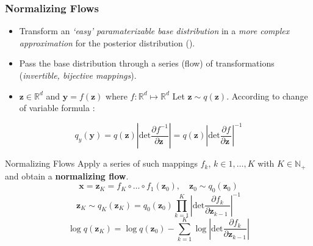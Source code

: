 \documentclass{beamer}
\begin{document}
\begin{frame}

\frametitle{Normalizing Flows}
\begin{itemize}
    \item Transform an \textit{‘easy' paramaterizable base distribution} in a \textit{more complex approximation} for the posterior distribution (\cite{rezende2015variational}).
    \pause
    \item Pass the base distribution through a series (flow) of transformations (\textit{invertible, bijective mappings}).
    \pause
    \item $\mathbf{z} \in \mathbb{R}^d$ and $\mathbf{y} = f(\mathbf{z})$ where $f: \mathbb{R}^d \mapsto \mathbb{R}^d$  Let $\mathbf{z} \sim q(\mathbf{z})$. According to change of variable formula :
\end{itemize}
\pause
\begin{equation}
    q_y(\mathbf{y}) = q(\mathbf{z}) \left|
    \mathrm{det} \frac{
      \partial f^{-1}
    }{
      \partial \mathbf{z}\
    }
  \right|
  = q(\mathbf{z}) \left|
    \mathrm{det} \frac{
      \partial f
    }{
      \partial \mathbf{z}\
    }
  \right| ^{-1}
\end{equation}
\end{frame}

\begin{frame}{Normalizing Flows}
Apply a series of such mappings $f_k$, $k \in {1,\dots, K}$ with $K \in \mathbb{N}_+$ and obtain a \textbf{normalizing flow}.
\pause
\begin{equation}
    \mathbf{x} = \mathbf{z}_K = f_K \circ \dots \circ f_1 (\mathbf{z}_0), \quad \mathbf{z}_0 \sim q_0(\mathbf{z}_0)
\end{equation}
\pause
\begin{equation}
    \mathbf{z}_K \sim q_K(\mathbf{z}_K) = q_0(\mathbf{z}_0) \prod_{k=1}^K
  \left|
    \mathrm{det} \frac{
      \partial f_k
    }{
      \partial \mathbf{z}_{k-1}\
    }
  \right| ^{-1}
\end{equation}
\pause
\begin{equation}
    \log q(\mathbf{z}_K) = \log q(\mathbf{z}_0) - \sum_{k=1}^{K} \log
    \left| \mathrm{det} \frac{\partial{f_k}}{\partial{\mathbf{z}_{k-1}}}
    \right|
\end{equation}
\end{frame}
\end{document}
